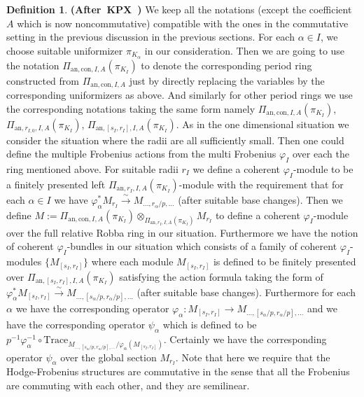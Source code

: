 \documentclass[12pt]{amsart}
\theoremstyle{definition}
\newtheorem{definition}[theorem]{Definition}
\numberwithin{equation}{section}
\begin{document}
\begin{definition} \mbox{\bf{(After KPX \cite[Definition 2.2.2]{KPX})}} \label{definition6.4}
We keep all the notations (except the coefficient $A$ which is now noncommutative) compatible with the ones in the commutative setting in the previous discussion in the previous sections. For each $\alpha\in I$, we choose suitable uniformizer $\pi_{K_\alpha}$ in our consideration. Then we are going to use the notation $\Pi_{\mathrm{an},\mathrm{con},I,A}(\pi_{K_I})$ to denote the corresponding period ring constructed from $\Pi_{\mathrm{an},\mathrm{con},I,A}$ just by directly replacing the variables by the corresponding uniformizers as above. And similarly for other period rings we use the corresponding notations taking the same form namely $\Pi_{\mathrm{an},\mathrm{con},I,A}(\pi_{K_I})$, $\Pi_{\mathrm{an},r_{I,0},I,A}(\pi_{K_I})$, $\Pi_{\mathrm{an},[s_I,r_I],I,A}(\pi_{K_I})$. As in the one dimensional situation we consider the situation where the radii are all sufficiently small. Then one could define the multiple Frobenius actions from the multi Frobenius $\varphi_I$ over each the ring mentioned above. For suitable radii $r_I$ we define a coherent $\varphi_I$-module to be a finitely presented left $\Pi_{\mathrm{an},r_{I},I,A}(\pi_{K_I})$-module with the requirement that for each $\alpha\in I$ we have $\varphi_\alpha^*M_{r_I}\overset{\sim}{\rightarrow}M_{...,r_\alpha/p,...}$ (after suitable base changes). Then we define $M:=\Pi_{\mathrm{an},\mathrm{con},I,A}(\pi_{K_I})\otimes_{\Pi_{\mathrm{an},r_{I},I,A}(\pi_{K_I})}M_{r_I}$ to define a coherent $\varphi_I$-module over the full relative Robba ring in our situation. Furthermore we have the notion of coherent $\varphi_I$-bundles in our situation which consists of a family of coherent $\varphi_I$-modules $\{M_{[s_I,r_I]}\}$ where each module $M_{[s_I,r_I]}$ is defined to be finitely presented over $\Pi_{\mathrm{an},[s_I,r_I],I,A}(\pi_{K_I})$ satisfying the action formula taking the form of $\varphi_\alpha^*M_{[s_I,r_I]}\overset{\sim}{\rightarrow}M_{...,[s_\alpha/p,r_\alpha/p],...}$ (after suitable base changes). Furthermore for each $\alpha$ we have the corresponding operator $\varphi_\alpha:M_{[s_I,r_I]}\rightarrow M_{...,[s_\alpha/p,r_\alpha/p],...}$ and we have the corresponding operator $\psi_\alpha$ which is defined to be $p^{-1}\varphi_\alpha^{-1}\circ\mathrm{Trace}_{M_{...,[s_\alpha/p,r_\alpha/p],...}/\varphi_\alpha(M_{[s_I,r_I]})}$. Certainly we have the corresponding operator $\psi_\alpha$ over the global section $M_{r_I}$. Note that here we require that the Hodge-Frobenius structures are commutative in the sense that all the Frobenius are commuting with each other, and they are semilinear.
\end{definition}
\end{document}
